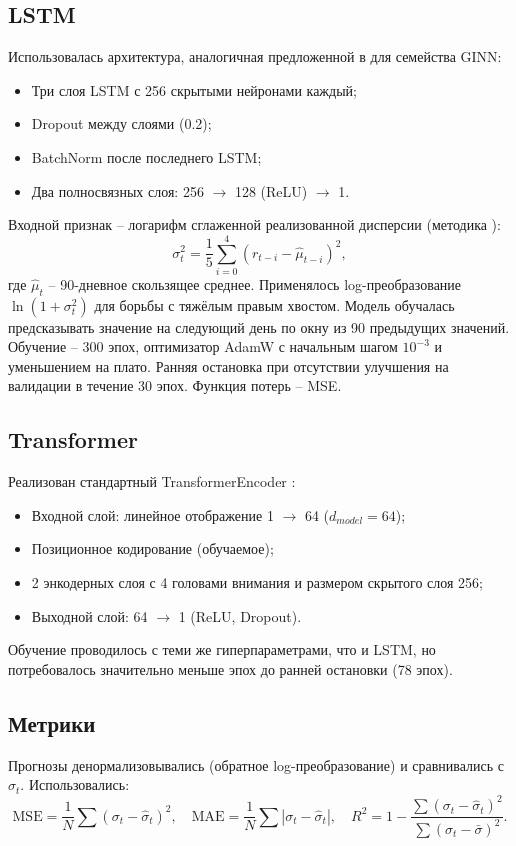 \documentclass[a4paper,12pt]{article}
\begin{document}
\subsection{LSTM}
Использовалась архитектура, аналогичная предложенной в \cite{Xu2024} для семейства GINN:
\begin{itemize}
\item Три слоя LSTM с 256 скрытыми нейронами каждый;
\item Dropout между слоями (0.2);
\item BatchNorm после последнего LSTM;
\item Два полносвязных слоя: 256 \(\to\) 128 (ReLU) \(\to\) 1.
\end{itemize}
Входной признак -- логарифм сглаженной реализованной дисперсии (методика \cite{Xu2024}):
\[
\sigma^2_t = \frac{1}{5}\sum_{i=0}^{4} (r_{t-i} - \hat{\mu}_{t-i})^2,
\]
где \(\hat{\mu}_t\) -- 90-дневное скользящее среднее. Применялось log-преобразование \(\ln(1+\sigma^2_t)\) для борьбы с тяжёлым правым хвостом. Модель обучалась предсказывать значение на следующий день по окну из 90 предыдущих значений. Обучение -- 300 эпох, оптимизатор AdamW с начальным шагом \(10^{-3}\) и уменьшением на плато. Ранняя остановка при отсутствии улучшения на валидации в течение 30 эпох. Функция потерь -- MSE.

\subsection{Transformer}
Реализован стандартный TransformerEncoder \cite{Vaswani2017}:
\begin{itemize}
\item Входной слой: линейное отображение 1 \(\to\) 64 (\(d_{model}=64\));
\item Позиционное кодирование (обучаемое);
\item 2 энкодерных слоя с 4 головами внимания и размером скрытого слоя 256;
\item Выходной слой: 64 \(\to\) 1 (ReLU, Dropout).
\end{itemize}
Обучение проводилось с теми же гиперпараметрами, что и LSTM, но потребовалось значительно меньше эпох до ранней остановки (78 эпох).

\subsection{Метрики}
Прогнозы денормализовывались (обратное log-преобразование) и сравнивались с \(\sigma_t\). Использовались:
\[
\text{MSE} = \frac{1}{N}\sum (\sigma_t - \hat{\sigma}_t)^2,\quad
\text{MAE} = \frac{1}{N}\sum |\sigma_t - \hat{\sigma}_t|,\quad
R^2 = 1 - \frac{\sum (\sigma_t - \hat{\sigma}_t)^2}{\sum (\sigma_t - \bar{\sigma})^2}.
\]
\end{document}
